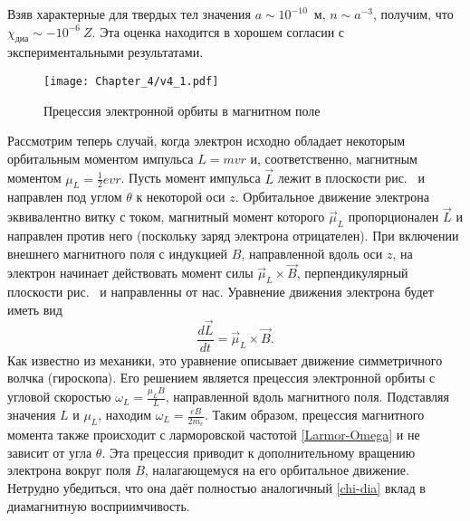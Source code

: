 Взяв характерные для твердых тел значения
$a \sim 10^{-10}$~м, $n\sim a^{-3}$, получим,
что $\chi_{диа} \sim -10^{-6}~Z$.
Эта оценка находится в хорошем согласии с экспериментальными результатами.

\begin{wrapfigure}[15]{r}{0.3\textwidth}
\centering
\texttt{[image: Chapter\_4/v4\_1.pdf]}
\caption{Прецессия электронной орбиты в магнитном поле}
\end{wrapfigure}

Рассмотрим теперь случай, когда электрон исходно обладает некоторым
орбитальным моментом импульса $L=mvr$ и, соответственно,
магнитным моментом $\mu_L= \frac12 e v r$.
Пусть момент импульса $\vec{L}$ лежит в плоскости
рис.~ и направлен под углом $\theta$ к некоторой оси $z$.
Орбитальное движение электрона эквивалентно витку с током,
магнитный момент которого $\vec{\mu}_L$ пропорционален $\vec{L}$
и направлен против него (поскольку заряд электрона отрицателен).
При включении внешнего магнитного поля с индукцией $B$,
направленной вдоль оси $z$, на электрон начинает
действовать момент силы $\vec{\mu}_L\times \vec{B}$,
перпендикулярный плоскости рис.~ и направленны от
нас. Уравнение движения электрона будет иметь вид
\begin{equation*}
	\frac{d\vec{L}}{dt} = \vec{\mu}_L\times \vec{B}.
\end{equation*}
Как известно из механики, это уравнение описывает движение симметричного волчка
(гироскопа). Его решением является
прецессия электронной орбиты с угловой скоростью
$\omega_{L} = \frac{\mu_L B}{L}$,
направленной вдоль магнитного поля.
Подставляя значения $L$ и $\mu_L$, находим
$\omega_L = \frac{eB}{2m_e}$.
Таким образом, прецессия магнитного момента также происходит с ларморовской частотой
\eqref{Larmor-Omega}
и не зависит от угла $\theta$. Эта прецессия приводит
к дополнительному вращению электрона вокруг поля $B$,
налагающемуся на его орбитальное движение. Нетрудно убедиться, что она
даёт полностью аналогичный \eqref{chi-dia} вклад в диамагнитную восприимчивость.


